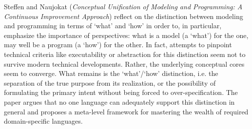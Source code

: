 


Steffen and Naujokat
\cite{isola-2016-steffen}
({\em Conceptual Unification of Modeling and Programming:
A Continuous Improvement Approach})
reflect on the distinction between modeling and programming  in terms of `what' and `how' in order to, in particular, emphasize the importance of perspectives: what is a model (a `what') for the one, may well be a program (a `how') for the other. In fact, attempts to pinpoint technical criteria like executability or abstraction for this distinction seem not to survive modern technical developments. Rather, the underlying conceptual cores seem to converge. What remains is the `what'/`how' distinction, i.e. the separation of the true purpose from its realization, or the possibility of formulating the primary intent without being forced to over-specification. The paper argues that no one language can adequately support this distinction in general and proposes a meta-level framework for mastering the wealth of required domain-specific languages.

